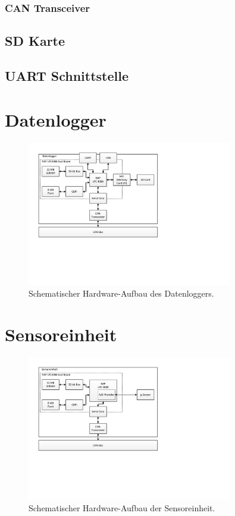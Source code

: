 \subsubsection{CAN Transceiver}


\subsection{SD Karte}

\subsection{UART Schnittstelle}

\section{Datenlogger}

\begin{figure}[H]
	\centering
		\includegraphics[width=0.8\textwidth]{images/visio/hardware_logger.pdf}
	\caption{Schematischer Hardware-Aufbau des Datenloggers.}
	\label{fig.hw_logger}
\end{figure}



\section{Sensoreinheit}

\begin{figure}[H]
	\centering
		\includegraphics[width=0.8\textwidth]{images/visio/hardware_sensor.pdf}
	\caption{Schematischer Hardware-Aufbau der Sensoreinheit.}
	\label{fig.hw_sensor}
\end{figure}



